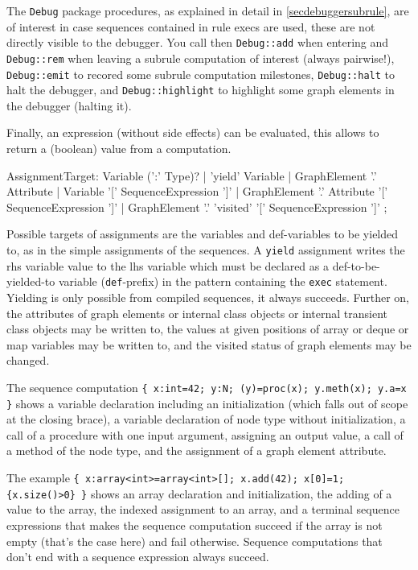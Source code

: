 The \texttt{Debug} package procedures, as explained in detail in \ref{secdebuggersubrule}, are of interest in case sequences contained in rule execs are used, these are not directly visible to the debugger.
You call then \texttt{Debug::add} when entering and \texttt{Debug::rem} when leaving a subrule computation of interest (always pairwise!),
\texttt{Debug::emit} to recored some subrule computation milestones, \texttt{Debug::halt} to halt the debugger, and \texttt{Debug::highlight} to highlight some graph elements in the debugger (halting it).

Finally, an expression (without side effects) can be evaluated, this allows to return a (boolean) value from a computation.

\begin{rail}
  AssignmentTarget: 
    Variable (':' Type)? |
    'yield' Variable |
    GraphElement '.' Attribute |
    Variable '[' SequenceExpression ']' |
    GraphElement '.' Attribute '[' SequenceExpression ']' |
    GraphElement '.' 'visited' '[' SequenceExpression ']'
;
\end{rail}

Possible targets of assignments are the variables and def-variables to be yielded to, as in the simple assignments of the sequences. 
A \texttt{yield} assignment writes the rhs variable value to the lhs variable which must be declared as a  def-to-be-yielded-to variable (\texttt{def}-prefix) in the pattern containing the \texttt{exec} statement.
Yielding is only possible from compiled sequences, it always succeeds.
Further on, the attributes of graph elements or internal class objects or internal transient class objects may be written to, the values at given positions of array or deque or map variables may be written to, and the visited status of graph elements may be changed.

\begin{example}
The sequence computation \verb#{ x:int=42; y:N; (y)=proc(x); y.meth(x); y.a=x }# shows a variable declaration including an initialization (which falls out of scope at the closing brace), a variable declaration of node type without initialization, a call of a procedure with one input argument, assigning an output value, a call of a method of the node type, and the assignment of a graph element attribute.

The example \verb#{ x:array<int>=array<int>[]; x.add(42); x[0]=1; {x.size()>0} }# shows an array declaration and initialization, the adding of a value to the array, the indexed assignment to an array, and a terminal sequence expressions that makes the sequence computation succeed if the array is not empty (that's the case here) and fail otherwise. Sequence computations that don't end with a sequence expression always succeed.
\end{example}

